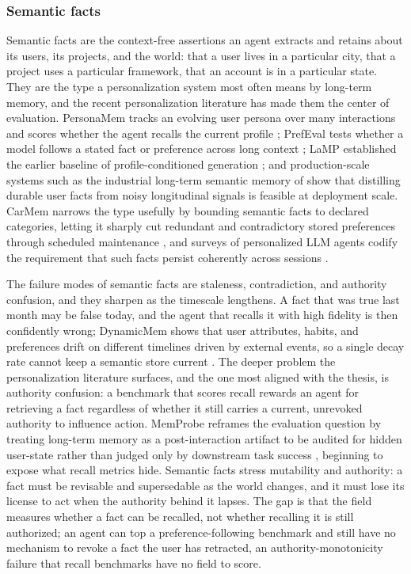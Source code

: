 \subsubsection{Semantic facts}

Semantic facts are the context-free assertions an agent extracts and retains about its users, its projects, and the world: that a user lives in a particular city, that a project uses a particular framework, that an account is in a particular state. They are the type a personalization system most often means by long-term memory, and the recent personalization literature has made them the center of evaluation. PersonaMem tracks an evolving user persona over many interactions and scores whether the agent recalls the current profile \citep{jiang2025personamem}; PrefEval tests whether a model follows a stated fact or preference across long context \citep{zhao2025prefeval}; LaMP established the earlier baseline of profile-conditioned generation \citep{salemi-etal-2024-lamp}; and production-scale systems such as the industrial long-term semantic memory of \citet{xu2026linkedinmemory} show that distilling durable user facts from noisy longitudinal signals is feasible at deployment scale. CarMem narrows the type usefully by bounding semantic facts to declared categories, letting it sharply cut redundant and contradictory stored preferences through scheduled maintenance \citep{kirmayr2025carmem}, and surveys of personalized LLM agents codify the requirement that such facts persist coherently across sessions \citep{xu2026personalizedllmpoweredagentsfoundations}.

The failure modes of semantic facts are staleness, contradiction, and authority confusion, and they sharpen as the timescale lengthens. A fact that was true last month may be false today, and the agent that recalls it with high fidelity is then confidently wrong; DynamicMem shows that user attributes, habits, and preferences drift on different timelines driven by external events, so a single decay rate cannot keep a semantic store current \citep{xie2026dynamicmem}. The deeper problem the personalization literature surfaces, and the one most aligned with the thesis, is authority confusion: a benchmark that scores recall rewards an agent for retrieving a fact regardless of whether it still carries a current, unrevoked authority to influence action. MemProbe reframes the evaluation question by treating long-term memory as a post-interaction artifact to be audited for hidden user-state rather than judged only by downstream task success \citep{ma2026memprobe}, beginning to expose what recall metrics hide. Semantic facts stress mutability and authority: a fact must be revisable and supersedable as the world changes, and it must lose its license to act when the authority behind it lapses. The gap is that the field measures whether a fact can be recalled, not whether recalling it is still authorized; an agent can top a preference-following benchmark and still have no mechanism to revoke a fact the user has retracted, an authority-monotonicity failure that recall benchmarks have no field to score.


